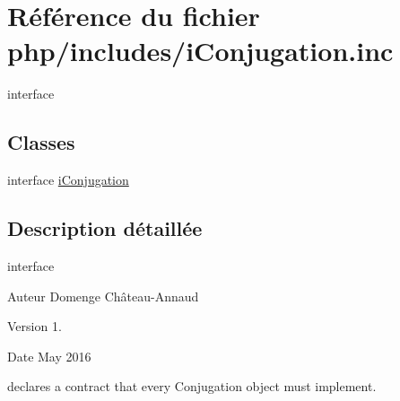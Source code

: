 \hypertarget{i_conjugation_8inc}{}\section{Référence du fichier php/includes/i\+Conjugation.inc}
\label{i_conjugation_8inc}


interface  


\subsection*{Classes}
\begin{DoxyCompactItemize}
\item 
interface \hyperlink{interfacei_conjugation}{i\+Conjugation}
\end{DoxyCompactItemize}


\subsection{Description détaillée}
interface 

\begin{DoxyAuthor}{Auteur}
Domenge Château-\/\+Annaud 
\end{DoxyAuthor}
\begin{DoxyVersion}{Version}
1. 
\end{DoxyVersion}
\begin{DoxyDate}{Date}
May 2016
\end{DoxyDate}
declares a contract that every Conjugation object must implement. 